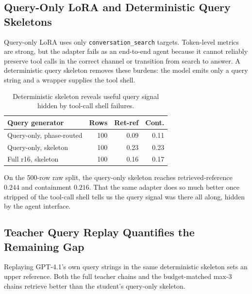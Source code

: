 \documentclass[11pt]{article}
\newcommand{\tool}[1]{\texttt{#1}}
\begin{document}
\subsection{Query-Only LoRA and Deterministic Query Skeletons}

Query-only LoRA uses only \tool{conversation\_search} targets. Token-level metrics are strong, but the adapter fails as an end-to-end agent because it cannot reliably preserve tool calls in the correct channel or transition from search to answer. A deterministic query skeleton removes these burdens: the model emits only a query string and a wrapper supplies the tool shell.

\begin{table}[t]
\centering
\small
\begin{tabular}{lrrr}
\toprule
\textbf{Query generator} & \textbf{Rows} & \textbf{Ret-ref} & \textbf{Cont.} \\
\midrule
Query-only, phase-routed & 100 & 0.09 & 0.11 \\
Query-only, skeleton & 100 & 0.23 & 0.23 \\
Full r16, skeleton & 100 & 0.16 & 0.17 \\
\bottomrule
\end{tabular}
\caption{Deterministic skeleton reveals useful query signal hidden by tool-call shell failures.}
\label{tab:skeleton}
\end{table}

On the 500-row raw split, the query-only skeleton reaches retrieved-reference $0.244$ and containment $0.216$. That the same adapter does so much better once stripped of the tool-call shell tells us the query signal was there all along, hidden by the agent interface.

\subsection{Teacher Query Replay Quantifies the Remaining Gap}

Replaying GPT-4.1's own query strings in the same deterministic skeleton sets an upper reference. Both the full teacher chains and the budget-matched max-3 chains retrieve better than the student's query-only skeleton.
\end{document}
